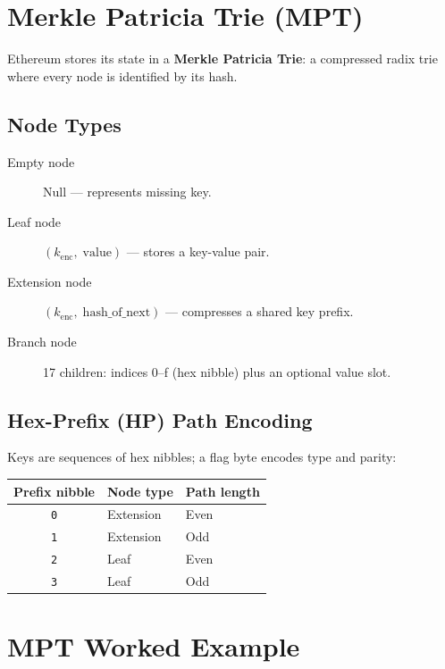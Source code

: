\documentclass[12pt,a4paper,openany]{book}
\theoremstyle{definition}
\theoremstyle{plain}
\theoremstyle{remark}
\begin{document}
\section{Merkle Patricia Trie (MPT)}

Ethereum stores its state in a \textbf{Merkle Patricia Trie}: a
compressed radix trie where every node is identified by its hash.

\subsection{Node Types}

\begin{description}
  \item[Empty node] Null — represents missing key.
  \item[Leaf node] $(k_{\text{enc}},\;\text{value})$ — stores a
        key-value pair.
  \item[Extension node] $(k_{\text{enc}},\;\text{hash\_of\_next})$ —
        compresses a shared key prefix.
  \item[Branch node] 17 children: indices 0--f (hex nibble) plus an
        optional value slot.
\end{description}

\subsection{Hex-Prefix (HP) Path Encoding}

Keys are sequences of hex nibbles; a flag byte encodes type and parity:
\begin{table}[h]
\centering
\begin{tabular}{cll}
\toprule
\textbf{Prefix nibble} & \textbf{Node type} & \textbf{Path length} \\
\midrule
\texttt{0} & Extension & Even \\
\texttt{1} & Extension & Odd \\
\texttt{2} & Leaf      & Even \\
\texttt{3} & Leaf      & Odd \\
\bottomrule
\end{tabular}
\end{table}

\section{MPT Worked Example}
\end{document}
